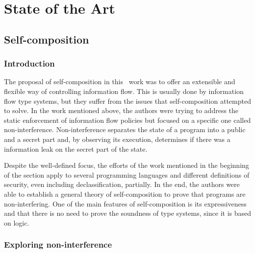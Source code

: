 
%

\makeatletter
\newcommand{\ntifpkgloaded}{%
  \@ifpackageloaded%
}
\makeatother


\chapter{State of the Art}
\label{cha:state_of_the_art}



\section{Self-composition} 
\label{sec:self_composition}

\subsection{Introduction}
\label{subsec:self_composition_intro}

The proposal of self-composition in this~\cite{DBLP:conf/csfw/BartheDR04} work was to offer an extensible and flexible way of controlling information flow.
This is usually done by information flow type systems, but they suffer from the issues that self-composition attempted to solve.
In the work mentioned above, the authors were trying to address the static enforcement of information flow policies but focused on a specific one called non-interference.
Non-interference separates the state of a program into a public and a secret part and, by observing its execution, determines if there was a information leak on the secret part of the state.

Despite the well-defined focus, the efforts of the work mentioned in the beginning of the section apply to several programming languages and different definitions of security, even including declassification, partially.
In the end, the authors were able to establish a general theory of self-composition to prove that programs are non-interfering.
One of the main features of self-composition is its expressiveness and that there is no need to prove the soundness of type systems, since it is based on logic.


\subsection{Exploring non-interference}
\label{subsec:exploring_non_interference}

